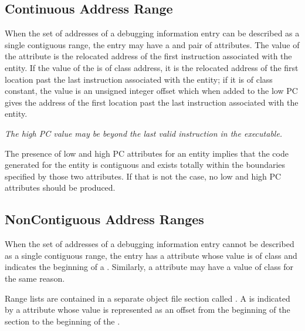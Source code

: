 \subsection{Continuous Address Range}
\label{chap:contiguousaddressranges}
When the set of addresses of a debugging information entry can
be described as a single contiguous range, the entry 
may 
have
a \DWATlowpc{} and 
\DWAThighpc{} pair of attributes. 
The value
of the 
\DWATlowpc{} attribute 
is the relocated address of the
first instruction associated with the entity. If the value of
the \DWAThighpc{} is of class address, it is the relocated
address of the first location past the last instruction
associated with the entity; if it is of class constant, the
value is an unsigned integer offset which when added to the
low PC gives the address of the first location past the last
instruction associated with the entity.

\textit{The high PC value
may be beyond the last valid instruction in the executable.}

The presence of low and high PC attributes for an entity
implies that the code generated for the entity is contiguous
and exists totally within the boundaries specified by those
two attributes. If that is not the case, no low and high PC
attributes should be produced.

\subsection{Non\dash Contiguous Address Ranges}
\label{chap:noncontiguousaddressranges}
When the set of addresses of a debugging information entry
cannot be described as a single contiguous range, the entry has
a \DWATranges{} attribute 
whose value is of class 
and indicates the beginning of a .
Similarly,
a \DWATstartscope{} attribute 
may have a value of class
 for the same reason.  

Range lists are contained in a separate object file section called 
\dotdebugranges{}. A
 is indicated by a 
\DWATranges{} attribute whose
value is represented as an offset from the beginning of the
\dotdebugranges{} section to the beginning of the 
.

